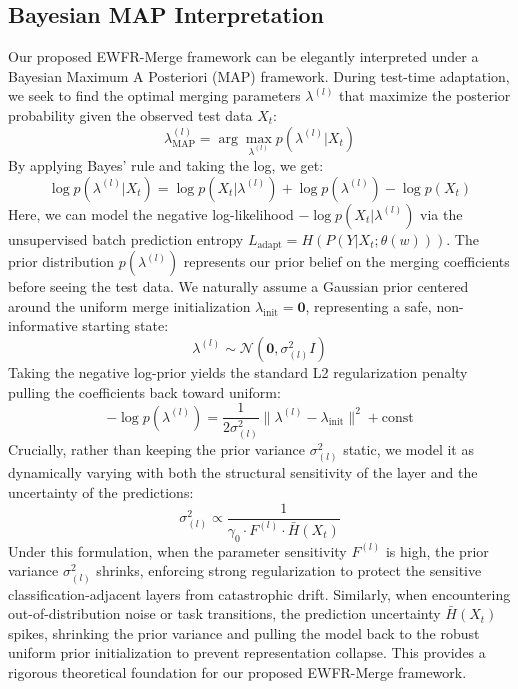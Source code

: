 \documentclass{article}
\theoremstyle{plain}
\theoremstyle{definition}
\theoremstyle{remark}
\begin{document}
\subsection{Bayesian MAP Interpretation}
Our proposed EWFR-Merge framework can be elegantly interpreted under a Bayesian Maximum A Posteriori (MAP) framework. During test-time adaptation, we seek to find the optimal merging parameters $\lambda^{(l)}$ that maximize the posterior probability given the observed test data $X_t$:
\begin{equation}
    \lambda_{\text{MAP}}^{(l)} = \arg\max_{\lambda^{(l)}} p(\lambda^{(l)} | X_t)
\end{equation}
By applying Bayes' rule and taking the log, we get:
\begin{equation}
    \log p(\lambda^{(l)} | X_t) = \log p(X_t | \lambda^{(l)}) + \log p(\lambda^{(l)}) - \log p(X_t)
\end{equation}
Here, we can model the negative log-likelihood $-\log p(X_t | \lambda^{(l)})$ via the unsupervised batch prediction entropy $L_{\text{adapt}} = H(P(Y | X_t; \theta(w)))$. The prior distribution $p(\lambda^{(l)})$ represents our prior belief on the merging coefficients before seeing the test data. We naturally assume a Gaussian prior centered around the uniform merge initialization $\lambda_{\text{init}} = \mathbf{0}$, representing a safe, non-informative starting state:
\begin{equation}
    \lambda^{(l)} \sim \mathcal{N}\left(\mathbf{0}, \sigma_{(l)}^2 I\right)
\end{equation}
Taking the negative log-prior yields the standard L2 regularization penalty pulling the coefficients back toward uniform:
\begin{equation}
    -\log p(\lambda^{(l)}) = \frac{1}{2 \sigma_{(l)}^2} \| \lambda^{(l)} - \lambda_{\text{init}} \|^2 + \text{const}
\end{equation}
Crucially, rather than keeping the prior variance $\sigma_{(l)}^2$ static, we model it as dynamically varying with both the structural sensitivity of the layer and the uncertainty of the predictions:
\begin{equation}
    \sigma_{(l)}^2 \propto \frac{1}{\gamma_0 \cdot F^{(l)} \cdot \bar{H}(X_t)}
\end{equation}
Under this formulation, when the parameter sensitivity $F^{(l)}$ is high, the prior variance $\sigma_{(l)}^2$ shrinks, enforcing strong regularization to protect the sensitive classification-adjacent layers from catastrophic drift. Similarly, when encountering out-of-distribution noise or task transitions, the prediction uncertainty $\bar{H}(X_t)$ spikes, shrinking the prior variance and pulling the model back to the robust uniform prior initialization to prevent representation collapse. This provides a rigorous theoretical foundation for our proposed EWFR-Merge framework.
\end{document}
